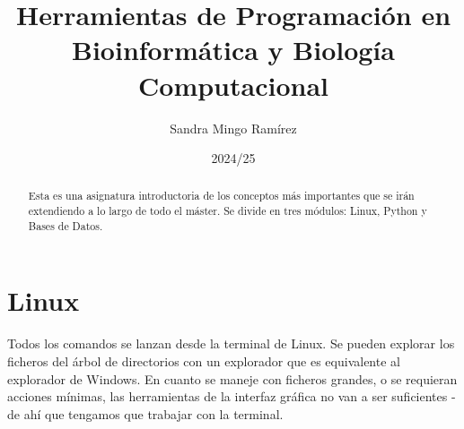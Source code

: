 \documentclass{config/apuntes}
\title{Herramientas de Programación en Bioinformática y Biología Computacional}
\author{Sandra Mingo Ramírez}
\date{2024/25}
\begin{document}
\begin{abstract}
Esta es una asignatura introductoria de los conceptos más importantes que se irán extendiendo a lo largo de todo el máster. Se divide en tres módulos: Linux, Python y Bases de Datos. 
\end{abstract}

\pagestyle{plain}

\maketitle

\tableofcontents

\chapter{Linux}
Todos los comandos se lanzan desde la terminal de Linux. Se pueden explorar los ficheros del árbol de directorios con un explorador que es equivalente al explorador de Windows. En cuanto se maneje con ficheros grandes, o se requieran acciones mínimas, las herramientas de la interfaz gráfica no van a ser suficientes - de ahí que tengamos que trabajar con la terminal. 
\end{document}
